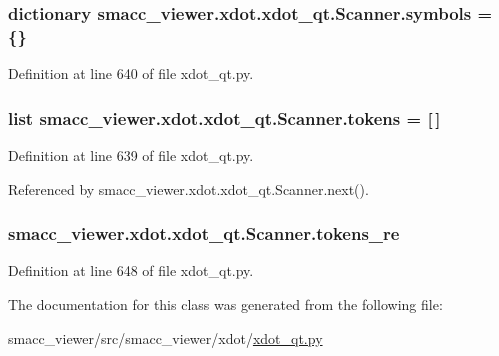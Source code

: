 \subsubsection[{\texorpdfstring{symbols}{symbols}}]{\setlength{\rightskip}{0pt plus 5cm}dictionary smacc\+\_\+viewer.\+xdot.\+xdot\+\_\+qt.\+Scanner.\+symbols = \{\}\hspace{0.3cm}{\ttfamily [static]}}\hypertarget{classsmacc__viewer_1_1xdot_1_1xdot__qt_1_1Scanner_a3910ada5bcaac1222b8dd542fed35490}{}\label{classsmacc__viewer_1_1xdot_1_1xdot__qt_1_1Scanner_a3910ada5bcaac1222b8dd542fed35490}


Definition at line 640 of file xdot\+\_\+qt.\+py.

\subsubsection[{\texorpdfstring{tokens}{tokens}}]{\setlength{\rightskip}{0pt plus 5cm}list smacc\+\_\+viewer.\+xdot.\+xdot\+\_\+qt.\+Scanner.\+tokens = \mbox{[}$\,$\mbox{]}\hspace{0.3cm}{\ttfamily [static]}}\hypertarget{classsmacc__viewer_1_1xdot_1_1xdot__qt_1_1Scanner_a8d7577fe009632274aaded49a04e2dfc}{}\label{classsmacc__viewer_1_1xdot_1_1xdot__qt_1_1Scanner_a8d7577fe009632274aaded49a04e2dfc}


Definition at line 639 of file xdot\+\_\+qt.\+py.



Referenced by smacc\+\_\+viewer.\+xdot.\+xdot\+\_\+qt.\+Scanner.\+next().

\subsubsection[{\texorpdfstring{tokens\+\_\+re}{tokens_re}}]{\setlength{\rightskip}{0pt plus 5cm}smacc\+\_\+viewer.\+xdot.\+xdot\+\_\+qt.\+Scanner.\+tokens\+\_\+re}\hypertarget{classsmacc__viewer_1_1xdot_1_1xdot__qt_1_1Scanner_a8675d493894ea6645ceeff68548d45bc}{}\label{classsmacc__viewer_1_1xdot_1_1xdot__qt_1_1Scanner_a8675d493894ea6645ceeff68548d45bc}


Definition at line 648 of file xdot\+\_\+qt.\+py.



The documentation for this class was generated from the following file\+:\begin{DoxyCompactItemize}
\item 
smacc\+\_\+viewer/src/smacc\+\_\+viewer/xdot/\hyperlink{xdot__qt_8py}{xdot\+\_\+qt.\+py}\end{DoxyCompactItemize}
